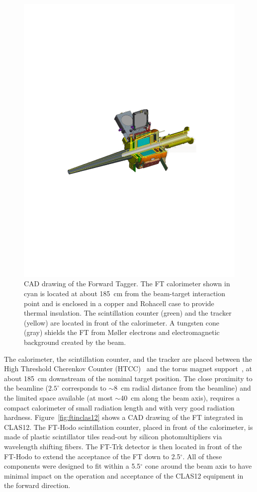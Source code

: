 \begin{figure}[th!]
\centering 
\includegraphics[width=\columnwidth]{./fig/ft-model.pdf} 
\caption{CAD drawing of the Forward Tagger. The FT calorimeter shown in cyan is located at about 185~cm from the
  beam-target interaction point and is enclosed in a copper and Rohacell case to provide thermal insulation. The scintillation
  counter (green) and the tracker (yellow) are located in front of the calorimeter. A tungsten cone (gray) shields the FT
  from M{\o}ller electrons and electromagnetic background created by the beam. } 
\label{fig:ftcad} 
\end{figure}

The calorimeter, the scintillation counter, and the tracker are placed between the High Threshold Cherenkov
Counter (HTCC)~\cite{htcc} and the torus magnet support~\cite{magnets}, at about 185~cm downstream of the
nominal target position. The close proximity to the beamline ($2.5^\circ$ corresponds to $\sim$8~cm radial distance
from the beamline) and the
limited space available (at most $\sim$40~cm along the beam axis), requires a compact calorimeter of small
radiation length and with very good radiation hardness. Figure~\ref{fig:ftinclas12} shows a CAD drawing of the
FT integrated in CLAS12. The FT-Hodo scintillation counter, placed in front of the calorimeter, is made of plastic
scintillator tiles  read-out by silicon photomultipliers via wavelength shifting fibers. The FT-Trk detector is then
located in front of the FT-Hodo to extend the acceptance of the FT down to 2.5$^\circ$. All of these
components were designed to fit within a 5.5$^{\circ}$ cone around the beam axis to have minimal impact on the operation
and acceptance of the CLAS12 equipment in the forward direction.

